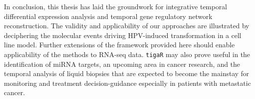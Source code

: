 In conclusion, this thesis has laid the groundwork for integrative temporal differential expression analysis and temporal gene regulatory network reconstruction. The validity and applicability of our approaches are illustrated by deciphering the molecular events driving HPV-induced transformation in a cell line model. Further extensions of the framework provided here should enable applicability of the methods to RNA-seq data. {\tt tigaR} may also prove useful in the identification of miRNA targets, an upcoming area in cancer research, and the temporal analysis of liquid biopsies that are expected to become the mainstay for monitoring and treatment decision-guidance especially in patients with metastatic cancer. 
